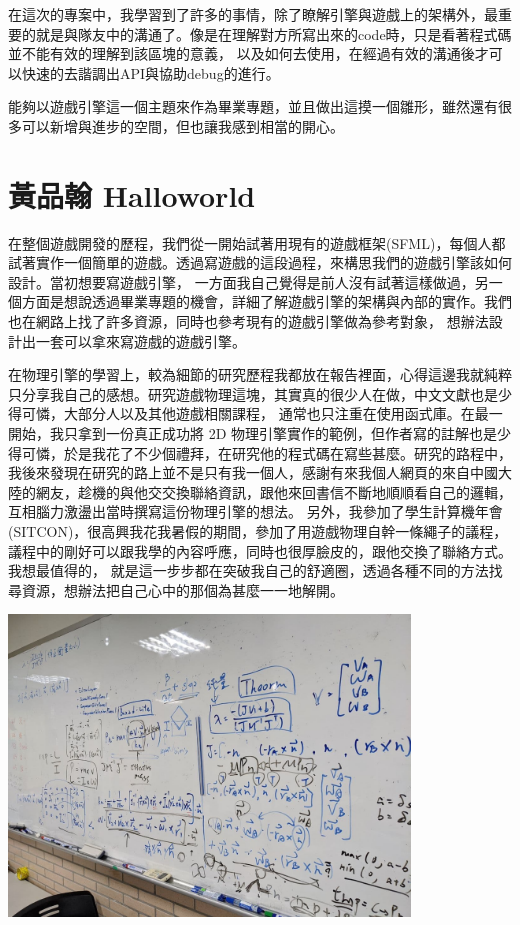 在這次的專案中，我學習到了許多的事情，除了瞭解引擎與遊戲上的架構外，最重要的就是與隊友中的溝通了。像是在理解對方所寫出來的code時，只是看著程式碼並不能有效的理解到該區塊的意義，
以及如何去使用，在經過有效的溝通後才可以快速的去諧調出API與協助debug的進行。

能夠以遊戲引擎這一個主題來作為畢業專題，並且做出這摸一個雛形，雖然還有很多可以新增與進步的空間，但也讓我感到相當的開心。

\section{黃品翰 Halloworld}
\label{sec:Halloworld}

在整個遊戲開發的歷程，我們從一開始試著用現有的遊戲框架(SFML)，每個人都試著實作一個簡單的遊戲。透過寫遊戲的這段過程，來構思我們的遊戲引擎該如何設計。當初想要寫遊戲引擎，
一方面我自己覺得是前人沒有試著這樣做過，另一個方面是想說透過畢業專題的機會，詳細了解遊戲引擎的架構與內部的實作。我們也在網路上找了許多資源，同時也參考現有的遊戲引擎做為參考對象，
想辦法設計出一套可以拿來寫遊戲的遊戲引擎。

在物理引擎的學習上，較為細節的研究歷程我都放在報告裡面，心得這邊我就純粹只分享我自己的感想。研究遊戲物理這塊，其實真的很少人在做，中文文獻也是少得可憐，大部分人以及其他遊戲相關課程，
通常也只注重在使用函式庫。在最一開始，我只拿到一份真正成功將 2D 物理引擎實作的範例，但作者寫的註解也是少得可憐，於是我花了不少個禮拜，在研究他的程式碼在寫些甚麼。研究的路程中，
我後來發現在研究的路上並不是只有我一個人，感謝有來我個人網頁的來自中國大陸的網友，趁機的與他交交換聯絡資訊，跟他來回書信不斷地順順看自己的邏輯，互相腦力激盪出當時撰寫這份物理引擎的想法。
另外，我參加了學生計算機年會(SITCON)，很高興我花我暑假的期間，參加了用遊戲物理自幹一條繩子的議程，議程中的剛好可以跟我學的內容呼應，同時也很厚臉皮的，跟他交換了聯絡方式。我想最值得的，
就是這一步步都在突破我自己的舒適圈，透過各種不同的方法找尋資源，想辦法把自己心中的那個為甚麼一一地解開。

    \begin{center}
    \includegraphics[width=0.8\textwidth]{./resources/ch6/halloworld_1.jpg}
    \end{center}

